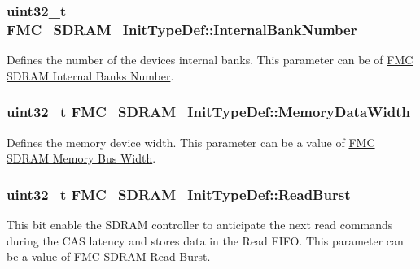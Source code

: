 \subsubsection[{\texorpdfstring{Internal\+Bank\+Number}{InternalBankNumber}}]{\setlength{\rightskip}{0pt plus 5cm}uint32\+\_\+t F\+M\+C\+\_\+\+S\+D\+R\+A\+M\+\_\+\+Init\+Type\+Def\+::\+Internal\+Bank\+Number}\hypertarget{struct_f_m_c___s_d_r_a_m___init_type_def_a11bcccbe5190e20eb00b2e07d9a16401}{}\label{struct_f_m_c___s_d_r_a_m___init_type_def_a11bcccbe5190e20eb00b2e07d9a16401}
Defines the number of the device\textquotesingle{}s internal banks. This parameter can be of \hyperlink{group___f_m_c___s_d_r_a_m___internal___banks___number}{F\+MC S\+D\+R\+AM Internal Banks Number}. 
\subsubsection[{\texorpdfstring{Memory\+Data\+Width}{MemoryDataWidth}}]{\setlength{\rightskip}{0pt plus 5cm}uint32\+\_\+t F\+M\+C\+\_\+\+S\+D\+R\+A\+M\+\_\+\+Init\+Type\+Def\+::\+Memory\+Data\+Width}\hypertarget{struct_f_m_c___s_d_r_a_m___init_type_def_a370d52e3c7296bd5d4d65344928af04c}{}\label{struct_f_m_c___s_d_r_a_m___init_type_def_a370d52e3c7296bd5d4d65344928af04c}
Defines the memory device width. This parameter can be a value of \hyperlink{group___f_m_c___s_d_r_a_m___memory___bus___width}{F\+MC S\+D\+R\+AM Memory Bus Width}. 
\subsubsection[{\texorpdfstring{Read\+Burst}{ReadBurst}}]{\setlength{\rightskip}{0pt plus 5cm}uint32\+\_\+t F\+M\+C\+\_\+\+S\+D\+R\+A\+M\+\_\+\+Init\+Type\+Def\+::\+Read\+Burst}\hypertarget{struct_f_m_c___s_d_r_a_m___init_type_def_aba6b0f5c64dc6d68a4a5dbe5c7511c4f}{}\label{struct_f_m_c___s_d_r_a_m___init_type_def_aba6b0f5c64dc6d68a4a5dbe5c7511c4f}
This bit enable the S\+D\+R\+AM controller to anticipate the next read commands during the C\+AS latency and stores data in the Read F\+I\+FO. This parameter can be a value of \hyperlink{group___f_m_c___s_d_r_a_m___read___burst}{F\+MC S\+D\+R\+AM Read Burst}. 
